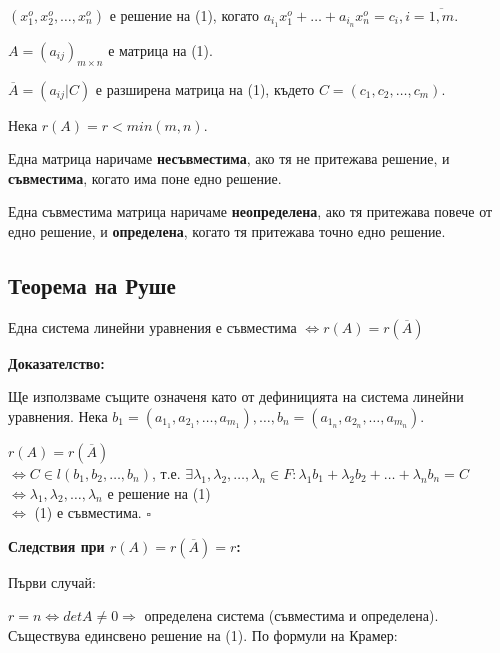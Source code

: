 \documentclass[fleqn,12pt]{article}
\begin{document}
\begin{flushleft}
$(x_1^o, x_2^o, \dots, x_n^o)$ е решение на (1), когато $a_{i_1}x_1^o+\dots+a_{i_n}x_n^o = c_i, i = \overline{1,m}$.

$ A = (a_{ij})_{m \times n} $ е матрица на (1).

$ \overline{A} = (a_{ij} | C) $ е разширена матрица на (1), където $C = (c_1, c_2, \dots, c_m)$.

Нека $ r(A) = r < min(m, n) $. \\

\vspace{5mm}

Една матрица наричаме \textbf{несъвместима}, ако тя не притежава решение, и \textbf{съвместима}, когато има поне едно решение.

\vspace{5mm}

Една съвместима матрица наричаме \textbf{неопределена}, ако тя притежава повече от едно решение, и \textbf{определена}, когато тя притежава точно едно решение.


\subsection{Теорема на Руше}
Една система линейни уравнения е съвместима $ \Leftrightarrow r(A) = r(\overline{A}) $

\vspace{5mm}
    
    \textbf{Доказателство:}

    Ще използваме същите означеня като от дефиницията на система линейни уравнения.
    Нека $b_1 = (a_{1_1}, a_{2_1}, \dots, a_{m_1}), \dots, b_n = (a_{1_n}, a_{2_n}, \dots, a_{m_n})$.

    \vspace{5mm}

    $ r(A) = r(\overline{A})$ \\
    $\Leftrightarrow C \in l(b_1, b_2, \dots, b_n)$, т.е. $\exists \lambda_1, \lambda_2, \dots, \lambda_n \in F: \lambda_1 b_1 + \lambda_2 b_2 + \dots + \lambda_n b_n = C$ \\
    $\Leftrightarrow \lambda_1, \lambda_2, \dots, \lambda_n$ е решение на (1) \\
    $\Leftrightarrow$ (1) е съвместима. $\square$

    \vspace{5mm}
    \textbf{Следствия при $r(A) = r(\overline{A}) = r$:}


    Първи случай: 

    $ r = n \Leftrightarrow detA \neq 0 \Rightarrow $ определена система (съвместима и определена). Съществува единсвено решение на (1). По формули на Крамер:


\end{flushleft}
\end{document}
